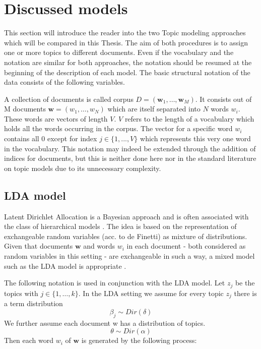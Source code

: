 \documentclass[11pt,a4paper]{article}
\author{Sebastian Knigge}
\begin{document}
\section{Discussed models}

This section will introduce the reader into the two Topic modeling approaches which will be compared in this Thesis. The aim of both procedures is to assign one or more topics to different documents. Even if the vocabulary and the notation are similar for both approaches, the notation should be resumed at the beginning of the description of each model. The basic structural notation of the data consists of the following variables.

A collection of documents is called corpus $D=(\textbf{w}_1,\dots , \textbf{w}_M)$. It consists out of M documents $\textbf{w}=(w_1,\dots, w_N)$ which are itself separated into $N$ words $w_i$. These words are vectors of length $V$. $V$ refers to the length of a vocabulary which holds all the words occurring in the corpus. The vector for a specific word $w_i$ contains all 0 except for index $j\in\{1,...,V\}$ which represents this very one word in the vocabulary.
This notation may indeed be extended through the addition of indices for documents, but this is neither done here nor in the standard literature on topic models due to its unnecessary complexity.


\subsection{LDA model}\label{sec:LDA}

Latent Dirichlet Allocation is a Bayesian approach and is often associated with the class of hierarchical models \cite{Gelman2014}. The idea is based on the representation of exchangeable random variables (acc. to de Finetti) as 
mixture of distributions. Given that documents $\textbf{w}$ and words $w_i$ in each document - both considered as random variables in this setting - are exchangeable in such a way, a mixed model such as the LDA model is appropriate \cite{Blei2003}.

The following notation is used in conjunction with the LDA model. Let $z_j$ be the topics with $j\in\{1,\dots,k\}$. In the LDA setting we assume for  every topic $z_j$ there is a term distribution
$$\beta_j \sim Dir(\delta)$$
We further assume each document w has a distribution of topics.
$$\theta \sim Dir(\alpha)$$
Then each word $w_i$ of $\textbf{w}$ is generated by the following process:
\end{document}
